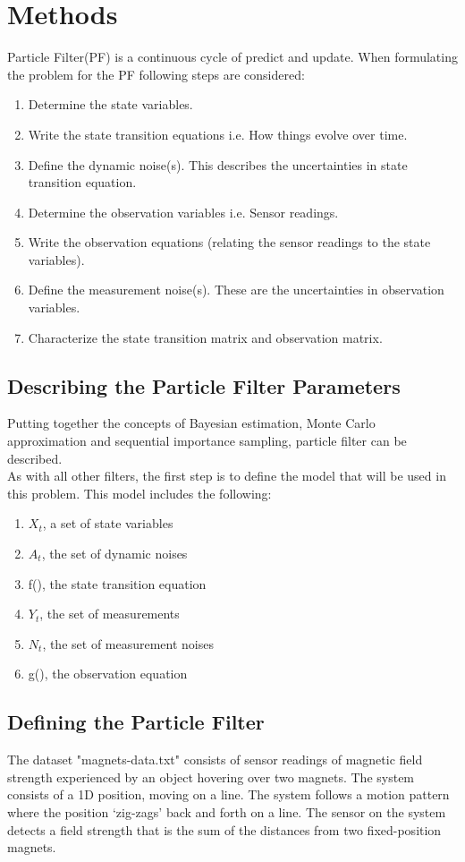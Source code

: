 \documentclass[12pt]{article}
\begin{document}
\section{Methods}
Particle Filter(PF) is a continuous cycle of predict and update. When formulating the problem for the PF following steps are considered:
\begin{enumerate}
	\item Determine the state variables.
	\item Write the state transition equations i.e. How things evolve over time.
	\item Define the dynamic noise(s).  This describes the uncertainties in state transition equation.
	\item Determine the observation variables i.e. Sensor readings.
	\item Write the observation equations (relating the sensor readings to the state variables).
	\item Define the measurement noise(s). These are the uncertainties in observation variables.
	\item Characterize the state transition matrix and observation matrix.
\end{enumerate}

\subsection{Describing the Particle Filter Parameters}
Putting together the concepts of Bayesian estimation, Monte Carlo approximation and sequential importance sampling, particle filter can be described. \\
As with all other filters, the first step is to define the model that will be used in this problem. This model includes the following: 
\begin{enumerate}
\item $X_t$, a set of state variables
\item $A_t$, the set of dynamic noises
\item f(), the state transition equation
\item $Y_t$, the set of measurements
\item $N_t$, the set of measurement noises
\item g(), the observation equation
\end{enumerate}

\subsection{Defining the Particle Filter}
The dataset "magnets-data.txt" consists of sensor readings of magnetic field strength experienced by an object hovering over two magnets. The system consists of a 1D position, moving on a line. The system follows a motion pattern where the position `zig-zags' back and forth on a line. The sensor on the system detects a field strength that is the sum of the distances from two fixed-position magnets.\\
\\ 
\end{document}
